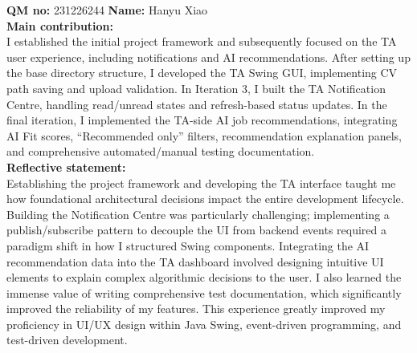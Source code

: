 \documentclass[12pt, a4paper]{article}
\begin{document}
\vspace{1.5em}
\textbf{QM no:} 231226244 \hspace{2em} \textbf{Name:} Hanyu Xiao\\
\textbf{Main contribution:}\\
I established the initial project framework and subsequently focused on the TA user experience, including notifications and AI recommendations. After setting up the base directory structure, I developed the TA Swing GUI, implementing CV path saving and upload validation. In Iteration 3, I built the TA Notification Centre, handling read/unread states and refresh-based status updates. In the final iteration, I implemented the TA-side AI job recommendations, integrating AI Fit scores, ``Recommended only'' filters, recommendation explanation panels, and comprehensive automated/manual testing documentation.\\
\textbf{Reflective statement:}\\
Establishing the project framework and developing the TA interface taught me how foundational architectural decisions impact the entire development lifecycle. Building the Notification Centre was particularly challenging; implementing a publish/subscribe pattern to decouple the UI from backend events required a paradigm shift in how I structured Swing components. Integrating the AI recommendation data into the TA dashboard involved designing intuitive UI elements to explain complex algorithmic decisions to the user. I also learned the immense value of writing comprehensive test documentation, which significantly improved the reliability of my features. This experience greatly improved my proficiency in UI/UX design within Java Swing, event-driven programming, and test-driven development.
\end{document}
